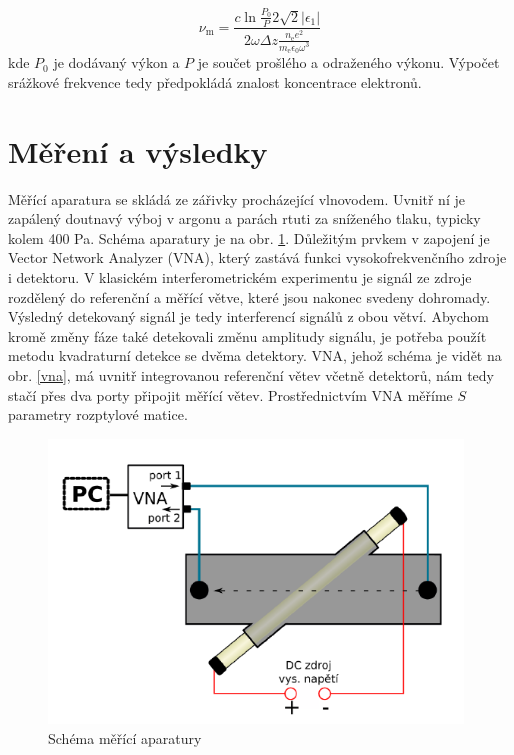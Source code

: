 \documentclass[a4paper,12pt]{article}
\begin{document}
\begin{equation}
	\nu_\text{m} = \frac{c \ln \frac{P_0}{P} 2 \sqrt{2}|\epsilon_1|}{2\omega \Delta z \frac{n_\text{e} e^2}{m_\text{e} \epsilon_0 \omega^3}}
\end{equation}
kde $P_0$ je dodávaný výkon a $P$ je součet prošlého a odraženého výkonu.
Výpočet srážkové frekvence tedy předpokládá znalost koncentrace elektronů.

\section{Měření a výsledky}
Měřící aparatura se skládá ze zářivky procházející vlnovodem. Uvnitř ní je
zapálený doutnavý výboj v argonu a parách rtuti 
za sníženého tlaku, typicky kolem 400 \si{\pascal}. Schéma aparatury je na obr.
\ref{schema}. Důležitým prvkem v zapojení je Vector Network Analyzer (VNA),
který zastává funkci vysokofrekvenčního zdroje i detektoru.
V klasickém interferometrickém experimentu je signál ze zdroje rozdělený do
referenční a měřící větve, které jsou nakonec svedeny dohromady. Výsledný 
detekovaný signál je tedy interferencí signálů z obou větví. Abychom kromě 
změny fáze také detekovali změnu amplitudy signálu, je potřeba použít metodu 
kvadraturní detekce se dvěma detektory. VNA, jehož schéma je vidět na 
obr. \ref{vna}, má uvnitř integrovanou referenční větev včetně detektorů, 
nám tedy stačí přes dva porty připojit měřící větev. Prostřednictvím VNA měříme $S$ parametry rozptylové matice.

\begin{figure}[h]
	\centering
	\includegraphics[width=110mm]{schema.png}
	\caption{Schéma měřící aparatury}
	\label{schema}
\end{figure}
\end{document}
